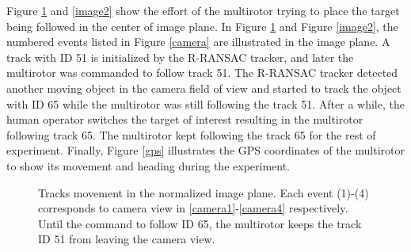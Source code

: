 \documentclass[letterpaper, 10 pt, conference]{ieeeconf}  %
\begin{document}
Figure \ref{image1} and \ref{image2} show the effort of the multirotor trying to place the target being followed in the center of image plane. In Figure \ref{image1} and Figure \ref{image2}, the numbered events listed in Figure \ref{camera} are illustrated in the image plane. A track with ID 51 is initialized by the R-RANSAC tracker, and later the multirotor was commanded to follow track 51. The R-RANSAC tracker detected another moving object in the camera field of view and started to track the object with ID 65 while the multirotor was still following the track 51. After a while, the human operator switches the target of interest resulting in the multirotor following track 65. The multirotor kept following the track 65 for the rest of experiment. Finally, Figure \ref{gps} illustrates the GPS coordinates of the multirotor to show its movement and heading during the experiment. 



\begin{figure}[h]
	\centering
	\caption{Tracks movement in the normalized image plane. Each event (1)-(4) corresponds to camera view in \ref{camera1}-\ref{camera4} respectively. Until the command to follow ID 65, the multirotor keeps the track ID 51 from leaving the camera view.}
	\label{image1}
\end{figure}
\end{document}
